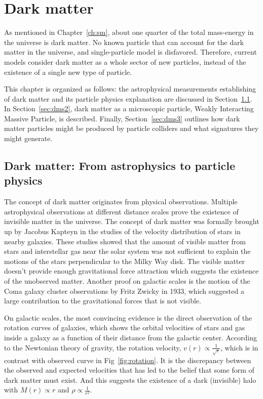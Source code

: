 \chapter{Dark matter}
\label{ch:dm}
\par As mentioned in Chapter~\ref{ch:sm}, about one quarter of the total mass-energy in the universe is dark matter. No known particle that can account for the dark matter in the universe, and single-particle model is disfavored. Therefore, current models consider dark matter as a whole sector of new particles, instead of the existence of a single new type of particle.

\par This chapter is organized as follows: the astrophysical measurements establishing of dark matter and its particle physics explanation are discussed in Section~\ref{sec:dms1}. In Section~\ref{sec:dms2}, dark matter as a microscopic particle, Weakly Interacting Massive Particle, is described. Finally, Section~\ref{sec:dms3} outlines how dark matter particles might be produced by particle colliders and what signatures they might generate.

\section{Dark matter: From astrophysics to particle physics}
\label{sec:dms1}

\par The concept of dark matter originates from physical observations. Multiple astrophysical observations at different distance scales prove the existence of invisible matter in the universe. The concept of dark matter was formally brought up by Jacobus Kapteyn in the studies of the velocity distribution of stars in nearby galaxies\cite{Kapteyn:1922zz}. These studies showed that the amount of visible matter from stars and interstellar gas near the solar system was not sufficient to explain the motions of the stars perpendicular to the Milky Way disk. The visible matter doesn't provide enough gravitational force attraction which suggests the existence of the unobserved matter. Another proof on galactic scales is the motion of the Coma galaxy cluster observations by Fritz Zwicky in 1933\cite{Zwicky:1933gu}, which suggested a large contribution to the gravitational forces that is not visible.

\par On galactic scales, the most convincing evidence is the direct observation of the rotation curves of galaxies, which shows the orbital velocities of stars and gas inside a galaxy as a function of their distance from the galactic center. According to the Newtonian theory of gravity, the rotation velocity, $v(r) \propto \frac{1}{\sqrt{r}}$, which is in contrast with observed curve in Fig~\ref{fig:rotation}. It is the discrepancy between the observed and expected velocities that has led to the belief that some form of dark matter must exist. And this suggests the existence of a dark (invisible) halo with $M(r) \propto r$ and $\rho \propto \frac{1}{r^2}$.


